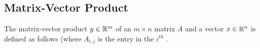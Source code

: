 \subsection{Matrix-Vector Product}
  \label{sec:compositeops_gemv}
  The matrix-vector product $y \in \mathbb{R}^m$ of an $m \times n$ matrix $A$ and a vector $x \in \mathbb{R}^n$ is defined as follows (where $A_{i, j}$ is the entry in the $i^{th}$ .
